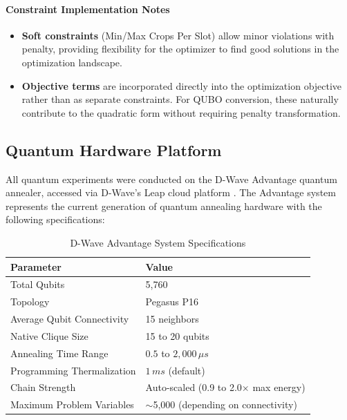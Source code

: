 \documentclass{oqireport}
\begin{document}
\paragraph{Constraint Implementation Notes}

\begin{itemize}
    \item \textbf{Soft constraints} (Min/Max Crops Per Slot) allow minor violations with penalty, providing flexibility for the optimizer to find good solutions in the optimization landscape.
    \item \textbf{Objective terms} are incorporated directly into the optimization objective rather than as separate constraints. For QUBO conversion, these naturally contribute to the quadratic form without requiring penalty transformation.
\end{itemize}



\subsection{Quantum Hardware Platform}

All quantum experiments were conducted on the D-Wave Advantage quantum annealer, accessed via D-Wave's Leap cloud platform \cite{dwave_hybrid_solver}. The Advantage system represents the current generation of quantum annealing hardware with the following specifications:

\begin{table}[H]
\centering
\caption{D-Wave Advantage System Specifications}
\label{tab:dwave_specs}
\begin{tabular}{ll}
\toprule
\textbf{Parameter} & \textbf{Value} \\
\midrule
Total Qubits & 5,760 \\
Topology & Pegasus P16 \\
Average Qubit Connectivity & 15 neighbors \\
Native Clique Size & 15 to 20 qubits \\
Annealing Time Range & $0.5$ to $2,000\,\mu s$ \\
Programming Thermalization & $1\,ms$ (default) \\
Chain Strength & Auto-scaled (0.9 to 2.0$\times$ max energy) \\
Maximum Problem Variables & $\sim$5,000 (depending on connectivity) \\
\bottomrule
\end{tabular}
\end{table}
\end{document}
